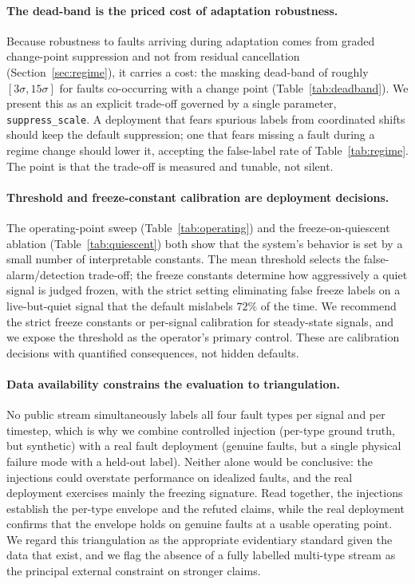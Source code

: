 \paragraph{The dead-band is the priced cost of adaptation robustness.}
Because robustness to faults arriving during adaptation comes from graded change-point suppression and not from residual cancellation (Section~\ref{sec:regime}), it carries a cost: the masking dead-band of roughly $[3\sigma, 15\sigma]$ for faults co-occurring with a change point (Table~\ref{tab:deadband}). We present this as an explicit trade-off governed by a single parameter, \texttt{suppress\_scale}. A deployment that fears spurious labels from coordinated shifts should keep the default suppression; one that fears missing a fault during a regime change should lower it, accepting the false-label rate of Table~\ref{tab:regime}. The point is that the trade-off is measured and tunable, not silent.

\paragraph{Threshold and freeze-constant calibration are deployment decisions.}
The operating-point sweep (Table~\ref{tab:operating}) and the freeze-on-quiescent ablation (Table~\ref{tab:quiescent}) both show that the system's behavior is set by a small number of interpretable constants. The mean threshold selects the false-alarm/detection trade-off; the freeze constants determine how aggressively a quiet signal is judged frozen, with the strict setting eliminating false freeze labels on a live-but-quiet signal that the default mislabels $72\%$ of the time. We recommend the strict freeze constants or per-signal calibration for steady-state signals, and we expose the threshold as the operator's primary control. These are calibration decisions with quantified consequences, not hidden defaults.

\paragraph{Data availability constrains the evaluation to triangulation.}
No public stream simultaneously labels all four fault types per signal and per timestep, which is why we combine controlled injection (per-type ground truth, but synthetic) with a real fault deployment (genuine faults, but a single physical failure mode with a held-out label). Neither alone would be conclusive: the injections could overstate performance on idealized faults, and the real deployment exercises mainly the freezing signature. Read together, the injections establish the per-type envelope and the refuted claims, while the real deployment confirms that the envelope holds on genuine faults at a usable operating point. We regard this triangulation as the appropriate evidentiary standard given the data that exist, and we flag the absence of a fully labelled multi-type stream as the principal external constraint on stronger claims.
